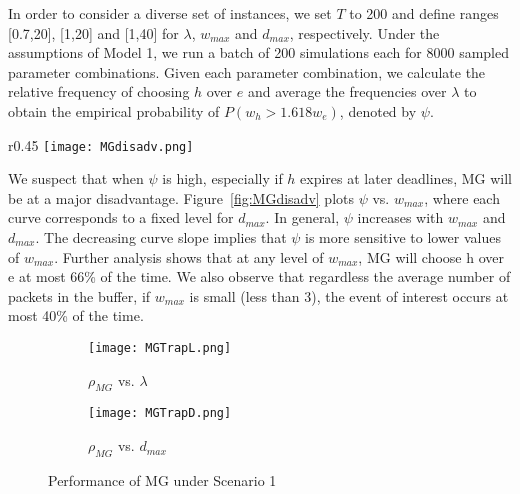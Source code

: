 \documentclass[oribibl]{llncs}
\begin{document}
In order to consider a diverse set of instances, we set $T$ to 200 and
define ranges [0.7,20], [1,20] and [1,40] for $\lambda$, $w_{max}$ and
$d_{max}$, respectively. Under the assumptions of Model 1, we run a
batch of 200 simulations each for 8000 sampled parameter combinations. Given
each parameter combination, we calculate the relative frequency of
choosing $h$ over $e$ and average the frequencies over $\lambda$ to
obtain the empirical probability of $P(w_h>1.618 w_e)$, denoted by
$\psi$. 

\begin{wrapfigure}[15]{r}{0.45\textwidth}\centering
\vspace{-18pt}
\texttt{[image: MGdisadv.png]} 
\caption{$\psi$ vs. $w_{max}$, colored by $d_{max}$}
\label{fig:MGdisadv}
\end{wrapfigure}

We suspect that when $\psi$ is high, especially if $h$ expires
at later deadlines, MG will  be at a major
disadvantage. Figure~\ref{fig:MGdisadv} plots $\psi$ vs. $w_{max}$,
where each curve corresponds to a fixed level for $d_{max}$. In
general, $\psi$ increases with $w_{max}$ and
$d_{max}$. The decreasing curve slope implies that $\psi$ is more
sensitive to lower values of $w_{max}$. Further analysis shows that at
any level of $w_{max}$, MG will
choose h over e at most 66\% of the time. We also observe that regardless the average number of
packets in the buffer, if $w_{max}$ is small (less than 3), 
the event of interest occurs at most 40\% of the time.



\begin{figure}[ht]\centering
\begin{subfigure}{.48\textwidth}
  \centering
  \texttt{[image: MGTrapL.png]}
  \caption{$\rho_{MG}$ vs. $\lambda$}
  \label{fig:MGtrapL}
\end{subfigure}
\begin{subfigure}{.48\textwidth}
  \centering
  \texttt{[image: MGTrapD.png]}
  \caption{$\rho_{MG}$ vs. $d_{max}$}
  \label{fig:MGtrapD}
\end{subfigure}
\caption{Performance of MG under Scenario 1}
\label{fig:MGtrap}
\end{figure}
\end{document}
